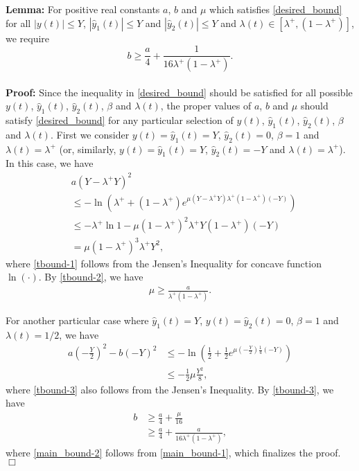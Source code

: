 \documentclass[journal]{IEEEtran}
\newcommand{\nn}{\nonumber}
\newcommand{\lp}{\lambda^+}
\begin{document}
\noindent
{\bf Lemma:} For positive real constants $a$, $b$ and $\mu$ which satisfies \eqref{desired_bound} for all $|y(t)| \leq Y$, $|\hat{y}_1(t)|\leq Y$ and $|\hat{y}_2(t)| \leq Y$ and $\lambda(t) \in [\lp, (1-\lp)]$, we require
\[
b \geq \frac{a}{4} + \frac{1}{16 \lp (1 -\lp)}.
\]\normalsize\\
\noindent
{\bf Proof:} Since the inequality in \eqref{desired_bound} should be
satisfied for all possible $y(t)$, $\hat{y}_1(t)$, $\hat{y}_2(t)$, $\beta$ and
$\lambda(t)$, the proper values of $a$, $b$ and $\mu$ should satisfy
\eqref{desired_bound} for any particular selection of $y(t)$,
$\hat{y}_1(t)$, $\hat{y}_2(t)$, $\beta$ and $\lambda(t)$. First we consider
$y(t)=\hat{y}_1(t)=Y$, $\hat{y}_2(t)=0$, $\beta=1$ and $\lambda(t)=\lp$ (or,
similarly, $y(t)=\hat{y}_1(t)=Y$, $\hat{y}_2(t)=-Y$ and
$\lambda(t)=\lp$). In this case, we have
\begin{align}
&a(Y - \lp Y)^2 \nn\\
&\leq - \ln (\lp + (1- \lp) e^{\mu (Y - \lp Y) \lp (1 - \lp) (-Y)}) \nonumber \\
& \leq - \lp \ln 1 - \mu (1- \lp)^2 \lp Y (1-\lp) (-Y) \label{tbound-1} \\
& = \mu (1- \lp)^3 \lp Y^2, \label{tbound-2}
\end{align}\normalsize
where \eqref{tbound-1} follows from the Jensen's Inequality for concave function $\ln(\cdot)$. By  \eqref{tbound-2}, we have
\begin{align}
\mu \geq \frac{a}{\lp(1- \lp)}. \label{main_bound-1}
\end{align}\normalsize

For another particular case where $\hat{y}_1(t)=Y$, $y(t)=\hat{y}_2(t)=0$, $\beta=1$ and $\lambda(t)=1/2$, we have
\begin{align}
a(- \frac{Y}{2})^2 - b (-Y)^2 & \leq - \ln (\frac{1}{2} + \frac{1}{2} e^{\mu (- \frac{Y}{2}) \frac{1}{4} (-Y)}) \nonumber \\
& \leq - \frac{1}{2}\mu \frac{Y^2}{8}, \label{tbound-3}
\end{align}\normalsize
where \eqref{tbound-3} also follows from the Jensen's Inequality. By \eqref{tbound-3}, we have
\begin{align}
b & \geq \frac{a}{4} + \frac{\mu}{16} \nonumber  \\
 & \geq \frac{a}{4} + \frac{a}{16 \lp (1 -\lp)}, \label{main_bound-2}
\end{align}
\normalsize
where \eqref{main_bound-2} follows from \eqref{main_bound-1}, which finalizes the proof. $\Box$
\end{document}
